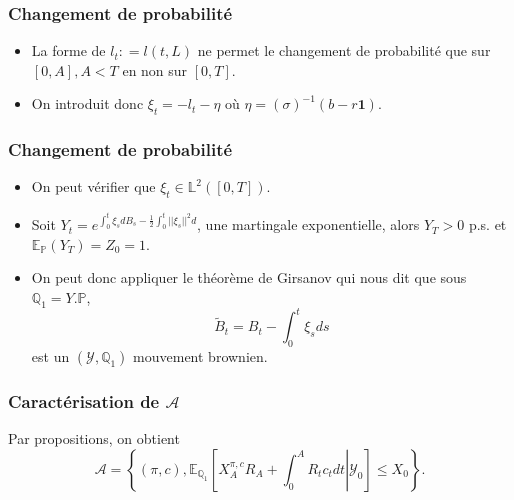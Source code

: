 \documentclass{beamer}
\begin{document}
\begin{frame}
\frametitle{Changement de probabilité}
\begin{itemize}
\item La forme de $l_t : = l(t, L)$ ne permet le changement de probabilité que sur $[0, A], A<T$ en non sur $[0, T]$. 
\item On introduit donc $\xi_t = -l_t - \eta$ où $\eta = (\sigma)^{-1} (b - r\textbf{1})$.
\end{itemize}

\end{frame}

\begin{frame}
\frametitle{Changement de probabilité}
\begin{itemize}
\item On peut vérifier que $\xi_t \in \mathbb{L}^2([0, T])$.
\item Soit $Y_t = e^{ \int_{0}^{t} \xi_s dB_s - \frac{1}{2} \int_{0}^{t} ||\xi_s||^2 d}$, une martingale exponentielle, alors $Y_T > 0$ p.s. et $\mathbb{E}_{\mathbb{P}} (Y_T) = Z_0 = 1$.\\
\item On peut donc appliquer le théorème de Girsanov qui nous dit que sous $\mathbb{Q}_1 = Y. \mathbb{P}$, 
\begin{equation*}
\tilde{B}_t = B_t - \displaystyle \int_{0}^{t}\xi_s ds
\end{equation*}
est un $(\mathcal{Y}, \mathbb{Q}_1)$ mouvement brownien.
\end{itemize}


 
 

\end{frame}

\begin{frame}
\frametitle{Caractérisation de $\mathcal{A}$}

Par propositions, on obtient 
\begin{equation*}
\mathcal{A} = \left\lbrace \left( \pi, c \right), \mathbb{E}_{\mathbb{Q}_1} \left[ X_A^{\pi, c} R_A + \int_0^A R_t c_t dt \left\vert\right. \mathcal{Y}_0 \right] \leq X_0 \right\rbrace .
\end{equation*}
\end{frame}
\end{document}

